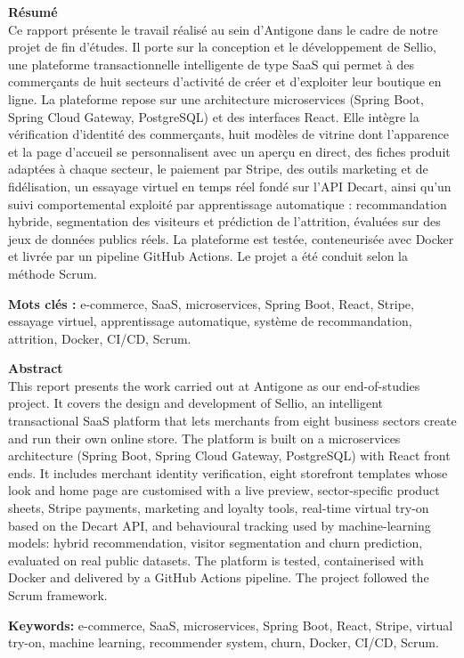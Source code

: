 \clearpage
\thispagestyle{empty}
\noindent\textbf{\large Résumé}\\[0.3cm]
Ce rapport présente le travail réalisé au sein d'Antigone dans le cadre de notre projet de fin d'études. Il porte sur la conception et le développement de Sellio, une plateforme transactionnelle intelligente de type SaaS qui permet à des commerçants de huit secteurs d'activité de créer et d'exploiter leur boutique en ligne. La plateforme repose sur une architecture microservices (Spring Boot, Spring Cloud Gateway, PostgreSQL) et des interfaces React. Elle intègre la vérification d'identité des commerçants, huit modèles de vitrine dont l'apparence et la page d'accueil se personnalisent avec un aperçu en direct, des fiches produit adaptées à chaque secteur, le paiement par Stripe, des outils marketing et de fidélisation, un essayage virtuel en temps réel fondé sur l'API Decart, ainsi qu'un suivi comportemental exploité par apprentissage automatique : recommandation hybride, segmentation des visiteurs et prédiction de l'attrition, évaluées sur des jeux de données publics réels. La plateforme est testée, conteneurisée avec Docker et livrée par un pipeline GitHub Actions. Le projet a été conduit selon la méthode Scrum.

\vspace{0.3cm}
\noindent\textbf{Mots clés :} e-commerce, SaaS, microservices, Spring Boot, React, Stripe, essayage virtuel, apprentissage automatique, système de recommandation, attrition, Docker, CI/CD, Scrum.

\vspace{1.2cm}
\noindent\textbf{\large Abstract}\\[0.3cm]
This report presents the work carried out at Antigone as our end-of-studies project. It covers the design and development of Sellio, an intelligent transactional SaaS platform that lets merchants from eight business sectors create and run their own online store. The platform is built on a microservices architecture (Spring Boot, Spring Cloud Gateway, PostgreSQL) with React front ends. It includes merchant identity verification, eight storefront templates whose look and home page are customised with a live preview, sector-specific product sheets, Stripe payments, marketing and loyalty tools, real-time virtual try-on based on the Decart API, and behavioural tracking used by machine-learning models: hybrid recommendation, visitor segmentation and churn prediction, evaluated on real public datasets. The platform is tested, containerised with Docker and delivered by a GitHub Actions pipeline. The project followed the Scrum framework.

\vspace{0.3cm}
\noindent\textbf{Keywords:} e-commerce, SaaS, microservices, Spring Boot, React, Stripe, virtual try-on, machine learning, recommender system, churn, Docker, CI/CD, Scrum.
